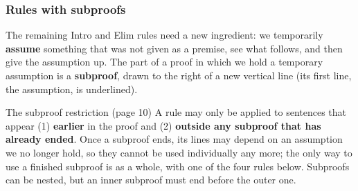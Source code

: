 \subsubsection{Rules with subproofs}

The remaining Intro and Elim rules need a new ingredient: we temporarily \textbf{assume}
something that was not given as a premise, see what follows, and then give the assumption
up. The part of a proof in which we hold a temporary assumption is a \textbf{subproof},
drawn to the right of a new vertical line (its first line, the assumption, is underlined).

\begin{nbfact}{The subproof restriction (page 10)}
A rule may only be applied to sentences that appear (1) \textbf{earlier} in the proof and
(2) \textbf{outside any subproof that has already ended}. Once a subproof ends, its lines may
depend on an assumption we no longer hold, so they cannot be used individually any more;
the only way to use a finished subproof is as a whole, with one of the four rules below.
Subproofs can be nested, but an inner subproof must end before the outer one.
\end{nbfact}

